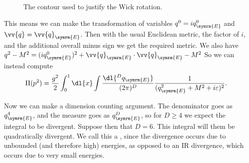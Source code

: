 \documentclass[fleqn]{NotesClass}
\let\Re\relax
\let\Im\relax
\DeclareMathOperator{\Re}{Re}
\DeclareMathOperator{\Im}{Im}
\begin{document}
    \begin{figure}
        \caption{The contour used to justify the Wick rotation.}
        \label{fig:wick rotation contour}
    \end{figure}
    
    This means we can make the transformation of variables \(q^0 = iq_{\symrm{E}}^0\) and \(\vv{q} = \vv{q}_{\symrm{E}}\).
    Then with the usual Euclidean metric, the factor of \(i\), and the additional overall minus sign we get the required metric.
    We also have \(q^2 - M^2 = (iq_{\symrm{E}}^0)^2 + \vv{q}_{\symrm{E}} \cdot \vv{q}_{\symrm{E}} - M^2\)
    So we can instead compute
    \begin{equation}
        \Pi(p^2) = \frac{g^2}{2} \int_0^1 \dl{x} \int \frac{\dl{^Dq_{\symrm{E}}}}{(2\pi)^D} \frac{1}{(q_{\symrm{E}}^2 + M^2 + i\varepsilon)^2}.
    \end{equation}
    
    Now we can make a dimension counting argument.
    The denominator goes as \(q_{\symrm{E}}^4\), and the measure goes as \(q_{\symrm{E}}^D\), so for \(D \ge 4\) we expect the integral to be divergent.
    Suppose then that \(D = 6\).
    This integral will them be quadratically divergent.
    We call this a , since the divergence occurs due to unbounded (and therefore high) energies, as opposed to an IR divergence, which occurs due to very small energies.
    
\end{document}
